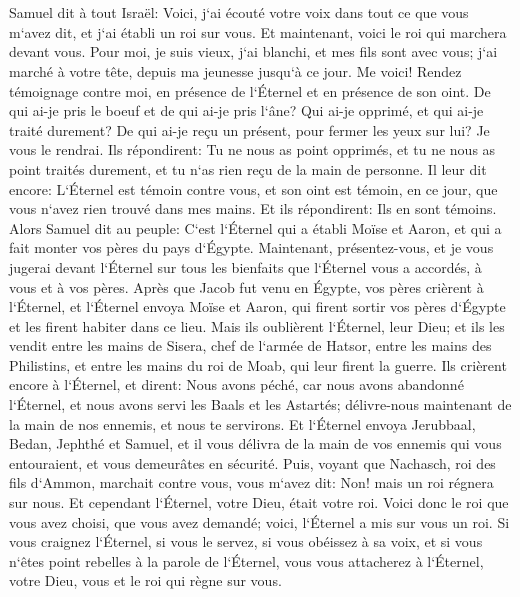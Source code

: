 \chapter{}

\verse Samuel dit à tout Israël: Voici, j`ai écouté votre voix dans tout ce que vous m`avez dit, et j`ai établi un roi sur vous. 
\verse Et maintenant, voici le roi qui marchera devant vous. Pour moi, je suis vieux, j`ai blanchi, et mes fils sont avec vous; j`ai marché à votre tête, depuis ma jeunesse jusqu`à ce jour. 
\verse Me voici! Rendez témoignage contre moi, en présence de l`Éternel et en présence de son oint. De qui ai-je pris le boeuf et de qui ai-je pris l`âne? Qui ai-je opprimé, et qui ai-je traité durement? De qui ai-je reçu un présent, pour fermer les yeux sur lui? Je vous le rendrai. 
\verse Ils répondirent: Tu ne nous as point opprimés, et tu ne nous as point traités durement, et tu n`as rien reçu de la main de personne. 
\verse Il leur dit encore: L`Éternel est témoin contre vous, et son oint est témoin, en ce jour, que vous n`avez rien trouvé dans mes mains. Et ils répondirent: Ils en sont témoins. 
\verse Alors Samuel dit au peuple: C`est l`Éternel qui a établi Moïse et Aaron, et qui a fait monter vos pères du pays d`Égypte. 
\verse Maintenant, présentez-vous, et je vous jugerai devant l`Éternel sur tous les bienfaits que l`Éternel vous a accordés, à vous et à vos pères. 
\verse Après que Jacob fut venu en Égypte, vos pères crièrent à l`Éternel, et l`Éternel envoya Moïse et Aaron, qui firent sortir vos pères d`Égypte et les firent habiter dans ce lieu. 
\verse Mais ils oublièrent l`Éternel, leur Dieu; et ils les vendit entre les mains de Sisera, chef de l`armée de Hatsor, entre les mains des Philistins, et entre les mains du roi de Moab, qui leur firent la guerre. 
\verse Ils crièrent encore à l`Éternel, et dirent: Nous avons péché, car nous avons abandonné l`Éternel, et nous avons servi les Baals et les Astartés; délivre-nous maintenant de la main de nos ennemis, et nous te servirons. 
\verse Et l`Éternel envoya Jerubbaal, Bedan, Jephthé et Samuel, et il vous délivra de la main de vos ennemis qui vous entouraient, et vous demeurâtes en sécurité. 
\verse Puis, voyant que Nachasch, roi des fils d`Ammon, marchait contre vous, vous m`avez dit: Non! mais un roi régnera sur nous. Et cependant l`Éternel, votre Dieu, était votre roi. 
\verse Voici donc le roi que vous avez choisi, que vous avez demandé; voici, l`Éternel a mis sur vous un roi. 
\verse Si vous craignez l`Éternel, si vous le servez, si vous obéissez à sa voix, et si vous n`êtes point rebelles à la parole de l`Éternel, vous vous attacherez à l`Éternel, votre Dieu, vous et le roi qui règne sur vous. 

